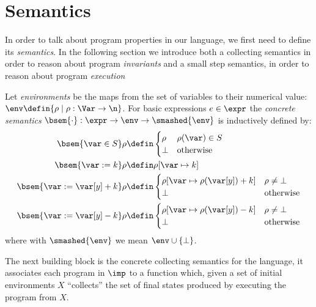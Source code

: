 \section{Semantics}\label{sec:semantics}

In order to talk about program properties in our language, we first
need to define its \emph{semantics}. In the following section we
introduce both a collecting semantics in order to reason about program
\emph{invariants} and a small step semantics, in order to reason about
program \emph{execution}

\begin{definition}
  Let \emph{environments} be the maps from the set of variables to
  their numerical value:
  \(\env \defin \{\rho \mid \rho : \Var \to \n\}\). For basic
  expressions \(e \in \expr\) the \emph{concrete semantics}
  \(\bsem{ \cdot} : \expr \to \env \to \smashed{\env}\) is
  inductively defined by:
  \begin{align*}
    \bsem{\var\in S} \rho & \defin \begin{cases} \rho & \rho(\var)\in S \\ \bot & \text{otherwise} \end{cases} \\
    \bsem{\var:= k} \rho & \defin \rho [\var\mapsto k] \\
    \bsem{\var:= \var[y] + k} \rho & \defin \begin{cases} \rho [\var\mapsto \rho(\var[y]) + k] & \rho \neq \bot \\ \bot & \text{otherwise}\end{cases} \\
    \bsem{\var:= \var[y] - k} \rho & \defin \begin{cases} \rho [\var\mapsto \rho(\var[y]) - k] & \rho \neq \bot \\ \bot & \text{otherwise}\end{cases} \\
  \end{align*}
  where with \(\smashed{\env}\) we mean \(\env \cup \{\bot\}\).
\end{definition}

The next building block is the concrete collecting semantics for the
language, it associates each program in \(\imp\) to a function which,
given a set of initial environments \(X\) ``collects'' the set of
final states produced by executing the program from \(X\).

